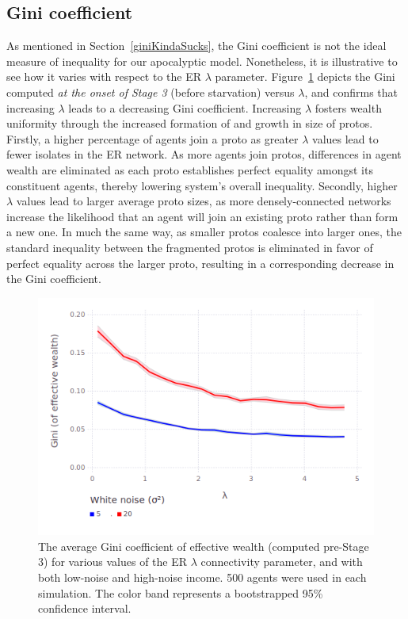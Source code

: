 \subsection{Gini coefficient}

As mentioned in Section~\ref{giniKindaSucks}, the Gini coefficient is not the ideal measure of inequality for our apocalyptic model. Nonetheless, it is illustrative to see how it varies with respect to the ER $\lambda$ parameter. Figure~\ref{fig:giniVsLambda} depicts the Gini computed \textit{at the onset of Stage 3} (before starvation) versus $\lambda$, and confirms that increasing $\lambda$ leads to a decreasing Gini coefficient. Increasing $\lambda$ fosters wealth uniformity through the increased formation of and growth in size of protos. Firstly, a higher percentage of agents join a proto as greater $\lambda$ values lead to fewer isolates in the ER network. As more agents join protos, differences in agent wealth are eliminated as each proto establishes perfect equality amongst its constituent agents, thereby lowering system's overall inequality. Secondly, higher $\lambda$ values lead to larger average proto sizes, as more densely-connected networks increase the likelihood that an agent will join an existing proto rather than form a new one. In much the same way, as smaller protos coalesce into larger ones, the standard inequality between the fragmented protos is eliminated in favor of perfect equality across the larger proto, resulting in a corresponding decrease in the Gini coefficient. 

\begin{figure}[hb]
\centering
\includegraphics[width=\columnwidth]{figures/giniVsLambda.png}
\caption{The average Gini coefficient of effective wealth (computed pre-Stage 3) for various values of the ER $\lambda$ connectivity parameter, and with both low-noise and high-noise income. 500 agents were used in each simulation. The color band represents a bootstrapped 95\% confidence interval.}
\label{fig:giniVsLambda}
\end{figure}

